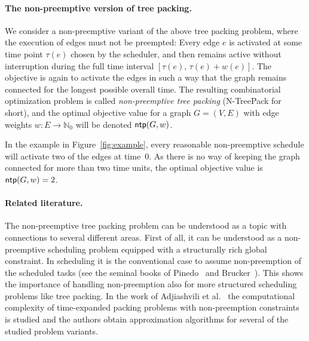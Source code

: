 \documentclass[runningheads]{llncs}
\newcommand{\NN}{\mathbb{N}}
\newcommand{\xxxNTP}{{\sc N-TreePack}}
\DeclareMathOperator{\ntp}{\text{\sf ntp}}
\newcommand{\lasse}[1]{#1}
\begin{document}
\paragraph{The non-preemptive version of tree packing.}
We consider a non-preemptive variant of the above tree packing problem,
where the execution of edges must not be preempted: 
Every edge $e$ is activated at some time point $\tau(e)$ chosen by the scheduler, and then 
remains active without interruption during the full time interval $[\tau(e),\,\tau(e)+w(e)]$.
The objective is again to activate the edges in such a way that the graph
remains connected for the longest possible overall time.
The resulting combinatorial optimization problem is called \emph{non-preemptive tree packing}
({\xxxNTP} for short), and the optimal objective value for a graph $G=(V,E)$ with edge 
weights $w:E\to\NN_0$ will be denoted $\ntp(G,w)$.

In the example in Figure~\ref{fig:example}, every reasonable non-preemptive
schedule will activate two of the edges at time~$0$.
As there is no way of keeping the graph connected for more than two time units, 
the optimal objective value is $\ntp(G,w)=2$.

\lasse{\paragraph{Related literature.}
The non-preemptive tree packing problem can be understood as a topic with connections to several different 
areas. First of all, it can be understood as a non-preemptive scheduling problem equipped with a structurally rich global constraint.
In scheduling it is the conventional case to assume non-preemption of the scheduled tasks (see the seminal books of Pinedo~\cite{pinedo2012scheduling} and Brucker~\cite{brucker1999scheduling}).
This shows the importance of handling non-preemption also for more structured scheduling problems like tree packing.
In the work of Adjiashvili et al.~\cite{adjiashvili2014time} the computational complexity of time-expanded packing problems with non-preemption constraints 
is studied and the authors obtain approximation algorithms for several of the studied problem variants.
}
\end{document}
